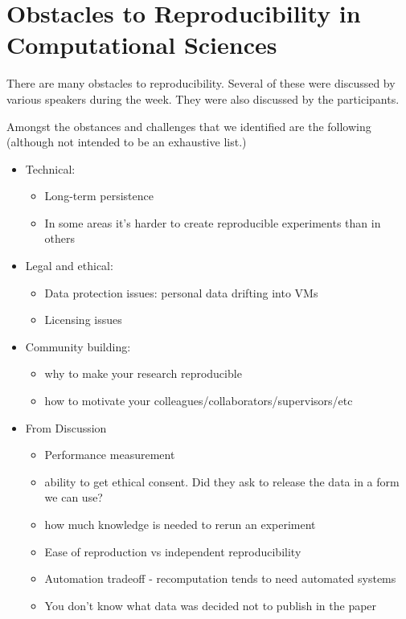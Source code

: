 \section{Obstacles to Reproducibility in Computational Sciences}
\label{s:obstacles}

There are many obstacles to reproducibility.   Several of these were discussed by various speakers during the week.  They were also discussed by the participants.

Amongst the obstances and challenges that we identified are the following (although not intended to be an exhaustive list.) 

\begin{itemize}
\item Technical:
 \begin{itemize}
  \item Long-term persistence
  \item In some areas it's harder to create reproducible experiments than in others
\end{itemize}

\item
Legal and ethical:

\begin{itemize}
  \item Data protection issues: personal data drifting into VMs
  \item Licensing issues
  \end{itemize}
  

\item
Community building:

\begin{itemize}
\item
  why to make your research reproducible
  \item how to motivate your colleagues/collaborators/supervisors/etc
  \end{itemize}
\item From Discussion
\begin{itemize} 

\item Performance measurement
\item ability to get ethical consent.  Did they ask to release the data in a form we can use?
\item how much knowledge is needed to rerun an experiment
\item Ease of reproduction vs independent reproducibility
\item Automation tradeoff - recomputation tends to need automated systems
\item You don't know what data was decided not to publish in the paper 
  \end{itemize}

  
\end{itemize}




